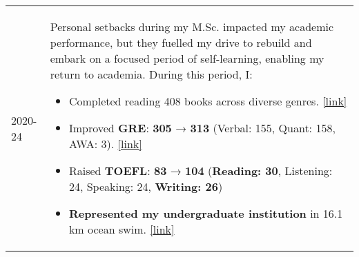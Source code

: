 \begin{longtable}[1]{@{}p{} p{}}
    2020-24 & Personal setbacks during my M.Sc. impacted my academic performance, but they fuelled my drive to rebuild and embark on a focused period of self-learning, enabling my return to academia. During this period, I:
    \setlength{\leftmargini}{1em} %
    \begin{itemize}
    \item Completed reading 408 books across diverse genres. \href{https://1drv.ms/f/c/919fe16e04062443/EslHLTL6GFpJgkHy3muLXZQBY7klQSSXQkR9-O9atsIlOw?e=MRbiyG}{[link]}
    \item Improved \textbf{GRE}: \textbf{305} → \textbf{313} (Verbal: 155, Quant: 158, AWA: 3). \href{https://1drv.ms/i/c/919fe16e04062443/EbxgDf84QvFNkkacacQ0DN8B52dDujGQV93n_c2GS_wqfg?e=x6LdEw}{[link]}
    \item Raised \textbf{TOEFL}: \textbf{83} → \textbf{104} (\textbf{Reading: 30}, Listening: 24, Speaking: 24, \textbf{Writing: 26})
    \item \textbf{Represented my undergraduate institution} in 16.1 km ocean swim.
    \href{https://bangladeshpost.net/posts/just-student-tarek-crosses-bangla-channel-101985}{[link]}
    \end{itemize}
    
\end{longtable}